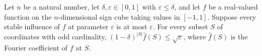 \begin{theorem}
\label{FABL.hastad_weighted_fourierCoeff_le_sqrt}
\leanok
{}
Let $n$ be a natural number, let $\delta,\varepsilon\in[0,1]$ with
$\varepsilon\le\delta$, and let $f$ be a real-valued function on the $n$-dimensional
sign cube taking values in $[-1,1]$. Suppose every stable influence of $f$ at parameter
$\varepsilon$ is at most $\varepsilon$. For every subset $S$ of coordinates with odd
cardinality, $(1-\delta)^{|S|}\widehat f(S)\le\sqrt{\varepsilon}$, where $\widehat f(S)$
is the Fourier coefficient of $f$ at $S$.
\end{theorem}

